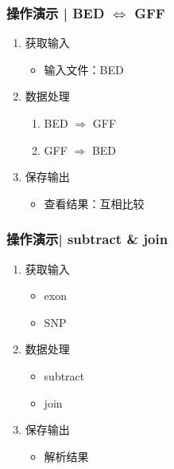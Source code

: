 \documentclass[table]{beamer}
\begin{document}
\begin{frame}
  \frametitle{操作演示 | BED $\Leftrightarrow$ GFF}
  \begin{enumerate}
    \item 获取输入
      \begin{itemize}
        \item 输入文件：BED
      \end{itemize}
    \item 数据处理
      \begin{enumerate}
        \item BED $\Rightarrow$ GFF
        \item GFF $\Rightarrow$ BED
      \end{enumerate}
    \item 保存输出
      \begin{itemize}
        \item 查看结果：互相比较
      \end{itemize}
  \end{enumerate}
\end{frame}

\begin{frame}
  \frametitle{操作演示| subtract \& join}
  \begin{enumerate}
    \item 获取输入
      \begin{itemize}
        \item exon
        \item SNP
      \end{itemize}
    \item 数据处理
      \begin{itemize}
        \item subtract
        \item join
      \end{itemize}
    \item 保存输出
      \begin{itemize}
        \item 解析结果
      \end{itemize}
  \end{enumerate}
\end{frame}
\end{document}

